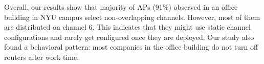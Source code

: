 Overall, our results show that majority of APs (91\%) observed in an office building in NYU campus select non-overlapping channels. However, most of them are distributed on channel 6. This indicates that they might use static channel configurations and rarely get configured once they are deployed. Our study also found a behavioral pattern: most companies in the office building do not turn off routers after work time.
